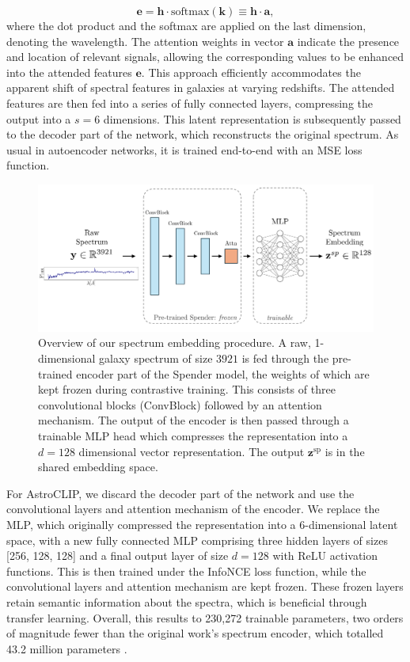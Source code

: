 \documentclass[a4paper,12pt]{article}
\begin{document}
\begin{equation}
    \mathbf{e} = \mathbf{h} \cdot \text{softmax}(\mathbf{k}) \equiv \mathbf{h} \cdot \mathbf{a},
\end{equation}
where the dot product and the softmax are applied on the last dimension, denoting the wavelength. The attention weights in vector $\mathbf{a}$ indicate the presence and location of relevant signals, allowing the corresponding values to be enhanced into the attended features $\mathbf{e}$. This approach efficiently accommodates the apparent shift of spectral features in galaxies at varying redshifts. The attended features are then fed into a series of fully connected layers, compressing the output into a $s=6$ dimensions. This latent representation is subsequently passed to the decoder part of the network, which reconstructs the original spectrum. As usual in autoencoder networks, it is trained end-to-end with an MSE loss function.

\begin{figure}[H]
    \centering
    \includegraphics[width=\textwidth]{../figures/diagram_spender_cropped.pdf} %
    \caption{Overview of our spectrum embedding procedure. A raw, 1-dimensional galaxy spectrum of size $3921$ is fed through the pre-trained encoder part of the Spender model, the weights of which are kept frozen during contrastive training. This consists of three convolutional blocks (ConvBlock) followed by an attention mechanism. The output of the encoder is then passed through a trainable MLP head which compresses the representation into a $d=128$ dimensional vector representation. The output $\mathbf{z}^{\text{sp}}$ is in the shared embedding space.}
    \label{fig:spender}
\end{figure}

For AstroCLIP, we discard the decoder part of the network and use the convolutional layers and attention mechanism of the encoder. We replace the MLP, which originally compressed the representation into a 6-dimensional latent space, with a new fully connected MLP comprising three hidden layers of sizes [256, 128, 128] and a final output layer of size $d=128$ with ReLU activation functions. This is then trained under the InfoNCE loss function, while the convolutional layers and attention mechanism are kept frozen. These frozen layers retain semantic information about the spectra, which is beneficial through transfer learning. Overall, this results to 230,272 trainable parameters, two orders of magnitude fewer than the original work's spectrum encoder, which totalled 43.2 million parameters \cite{astroclip}.
\end{document}
